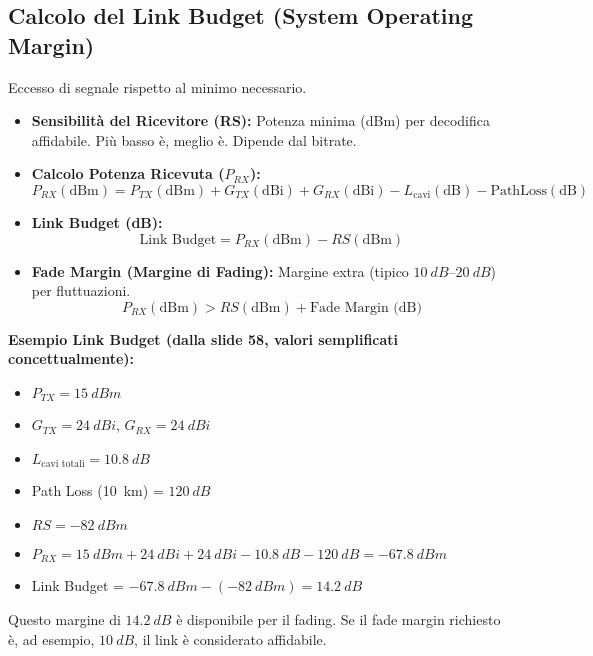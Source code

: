 \subsection{Calcolo del Link Budget (System Operating Margin)}
Eccesso di segnale rispetto al minimo necessario.
\begin{itemize}
    \item \textbf{Sensibilità del Ricevitore (RS):} Potenza minima (dBm) per decodifica affidabile. Più basso è, meglio è. Dipende dal bitrate.
    \item \textbf{Calcolo Potenza Ricevuta ($P_{RX}$):}
    \[ P_{RX} (\text{dBm}) = P_{TX} (\text{dBm}) + G_{TX} (\text{dBi}) + G_{RX} (\text{dBi}) - L_{\text{cavi}} (\text{dB}) - \text{PathLoss} (\text{dB}) \]
    \item \textbf{Link Budget (dB):}
    \[ \text{Link Budget} = P_{RX} (\text{dBm}) - RS (\text{dBm}) \]
    \item \textbf{Fade Margin (Margine di Fading):} Margine extra (tipico $\SIrange{+10}{+20}{dB}$) per fluttuazioni.
    \[ P_{RX} (\text{dBm}) > RS (\text{dBm}) + \text{Fade Margin (dB)} \]
\end{itemize}
\textbf{Esempio Link Budget (dalla slide 58, valori semplificati concettualmente):}
\begin{itemize}
    \item $P_{TX} = \SI{+15}{dBm}$
    \item $G_{TX} = \SI{+24}{dBi}$, $G_{RX} = \SI{+24}{dBi}$
    \item $L_{\text{cavi totali}} = \SI{10.8}{dB}$
    \item Path Loss (\SI{10}{km}) = $\SI{120}{dB}$
    \item $RS = \SI{-82}{dBm}$
    \item $P_{RX} = \SI{15}{dBm} + \SI{24}{dBi} + \SI{24}{dBi} - \SI{10.8}{dB} - \SI{120}{dB} = \SI{-67.8}{dBm}$
    \item Link Budget = $\SI{-67.8}{dBm} - (\SI{-82}{dBm}) = \SI{+14.2}{dB}$
\end{itemize}
Questo margine di $\SI{14.2}{dB}$ è disponibile per il fading. Se il fade margin richiesto è, ad esempio, $\SI{10}{dB}$, il link è considerato affidabile.

